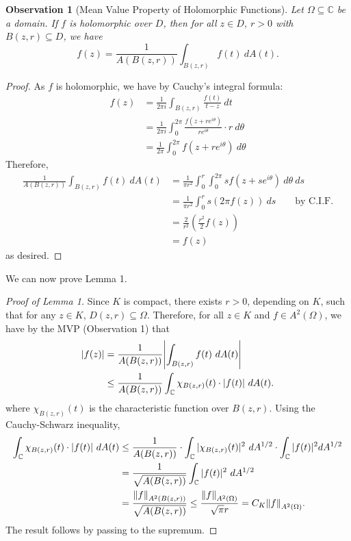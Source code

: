 \documentclass[10pt]{article}
\theoremstyle{plain}
\newtheorem{observation}{Observation}
\begin{document}
	\newpage 
	\begin{observation}[Mean Value Property of Holomorphic Functions]
		Let $\Omega \subseteq \mathbb{C}$ be a domain. If $f$ is holomorphic over $D$, then for all $z \in D$, $r > 0$ with $B(z, r) \subseteq D$, we have
			$$f(z) = \frac{1}{A(B(z, r))} \int_{B(z, r)} f(t) \ dA(t).$$
	\end{observation}
		\begin{proof}
			As $f$ is holomorphic, we have by Cauchy's integral formula:
				\begin{align*}
					f(z) &= \frac{1}{2 \pi i} \int_{B(z, r)} \frac{f(t)}{t - z} \ dt \\
					&= \frac{1}{2 \pi i} \int_{0}^{2\pi} \frac{f(z + re^{i \theta})}{re^{i \theta}} \cdot r \ d\theta \\
					&= \frac{1}{2 \pi} \int_{0}^{2 \pi} f(z + re^{i \theta})  \ d \theta 
				\end{align*}
			Therefore,
				\begin{align*}
					\frac{1}{A(B(z, r))} \int_{B(z, r)} f(t) \ dA(t) &= \frac{1}{\pi r^2} \int_0^{r} \int_{0}^{2 \pi} s f(z + se^{i \theta}) \ d \theta \ ds \\
					&= \frac{1}{\pi r^2} \int_{0}^r s (2 \pi f(z)) \ ds \qquad \text{by C.I.F.} \\
					&= \frac{2}{r^2} \left(\frac{r^2}{2} f(z)\right) \\
					&= f(z)
				\end{align*}
			as desired.
		\end{proof}
	
	\noindent We can now prove Lemma 1.
		\begin{proof}[Proof of Lemma 1]
			Since $K$ is compact, there exists $r > 0$, depending on $K$, such that for any $z \in K$, $D(z, r) \subseteq \Omega$. Therefore, for all $z \in K$ and $f \in A^2(\Omega)$, we have by the MVP (Observation 1) that
				\begin{align*}
					\abs{f(z)} &= \frac{1}{A(B(z, r))}\abs{\int_{B(z, r)} f(t) \ dA(t)} \\
					&\leq \frac{1}{A(B(z, r))} \int_{\mathbb{C}} \chi_{B(z, r)}(t) \cdot |f(t)| \ dA(t).
				\end{align*}
			where $\chi_{B(z, r)}(t)$ is the characteristic function over $B(z, r)$. Using the Cauchy-Schwarz inequality, 
				\begin{align*}
					\int_{\mathbb{C}} \chi_{B(z, r)}(t) \cdot |f(t)| \ dA(t) &\leq \frac{1}{A(B(z, r))} \cdot \int_{\mathbb{C}} |\chi_{B(z, r)}(t)|^2 \ dA^{1/2} \cdot \int_{\mathbb{C}} |f(t)|^2 dA^{1/2} \\
					&= \frac{1}{\sqrt{A(B(z, r))}} \int_{\mathbb{C}} |f(t)|^2 \ dA^{1/2} \\
					&= \frac{\norm{f}_{A^2(B(z, r))}}{\sqrt{A(B(z, r))}} \leq \frac{\norm{f}_{A^2(\Omega)}}{\sqrt{\pi}r} = C_K \norm{f}_{A^2(\Omega)}.
				\end{align*}
			The result follows by passing to the supremum. 
		\end{proof}
	
\end{document}
